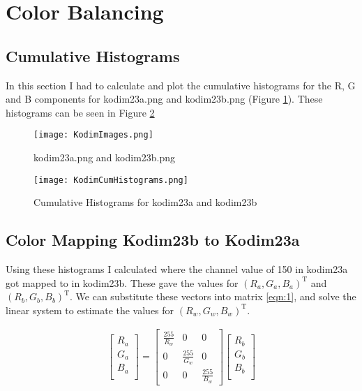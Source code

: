 \section{Color Balancing}
\subsection{Cumulative Histograms}
In this section I had to calculate and plot the cumulative histograms for the R, G and B components for kodim23a.png and kodim23b.png (Figure \ref{fig:KodimImages}). These histograms can be seen in Figure \ref{fig:KodimCumHistogram}

\begin{figure}[h]
    \texttt{[image: KodimImages.png]}
    \centering
    \caption{kodim23a.png and kodim23b.png}
    \label{fig:KodimImages}
\end{figure}

\begin{figure}[h]
    \texttt{[image: KodimCumHistograms.png]}
    \centering
    \caption{Cumulative Histograms for kodim23a and kodim23b}
    \label{fig:KodimCumHistogram}
\end{figure}

\subsection{Color Mapping Kodim23b to Kodim23a}
Using these histograms I calculated where the channel value of 150 in kodim23a got mapped to in kodim23b. These gave the values for $(R_a, G_a, B_a)^\mathrm{T}$ and $(R_b, G_b, B_b)^\mathrm{T}$. We can substitute these vectors into matrix \ref{eqn:1}, and solve the linear system to estimate the values for $(R_w, G_w, B_w)^\mathrm{T}$.

\begin{gather}
    \begin{bmatrix}
        R_a \\
        G_a \\
        B_a \\       
    \end{bmatrix}
    =
    \begin{bmatrix}
        \frac{255}{R_w} & 0 & 0 \\
        0 & \frac{255}{G_w} & 0 \\
        0 & 0 & \frac{255}{B_w}
    \end{bmatrix}
    \begin{bmatrix}
        R_b \\
        G_b \\
        B_b \\
    \end{bmatrix}
    \label{eqn:1}
\end{gather}

